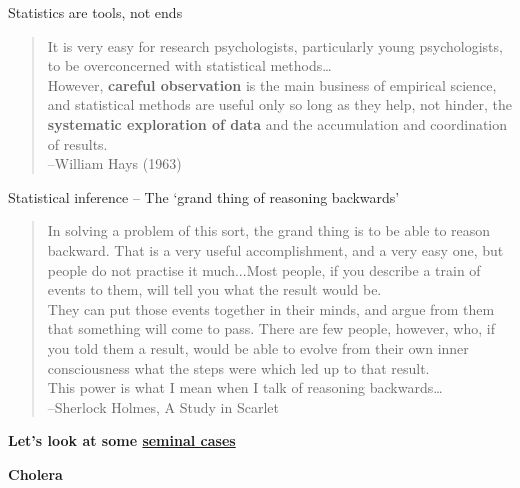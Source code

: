 \documentclass[aspectratio=1610,pdftex,dvipsnames,compress,xcolor={dvipsnames}]{beamer}
\begin{document}
\begin{frame}{Statistics are tools, not ends}
    \begin{quote}
        It is very easy for research psychologists, particularly young psychologists, to be overconcerned with statistical methods\ldots\\
        However, \textbf{careful observation} is the main business of empirical science, and statistical methods are useful only so long as they help, not hinder, the \textbf{systematic exploration of data} and the accumulation and coordination of results.\\
        --William Hays (1963)
    \end{quote}
\end{frame}


\begin{frame}{Statistical inference -- The `grand thing of reasoning backwards'}
    \begin{quote}
        In solving a problem of this sort, the grand thing is to be able to reason backward. That is a very useful accomplishment, and a very easy one, but people do not practise it much...Most people, if you describe a train of events to them, will tell you what the result would be.\\
        They can put those events together in their minds, and argue from them that something will come to pass.  There are few people, however, who, if you told them a result, would be able to evolve from their own inner consciousness what the steps were which led up to that result.\\
        This power is what I mean when I talk of reasoning backwards\ldots\\
        --Sherlock Holmes, A Study in Scarlet
    \end{quote}
\end{frame}


\begin{frame}[plain]{}
    \centering\LARGE\textbf{Let's look at some \href{https://uidaho.pressbooks.pub/riskassessment/chapter/probability-and-statistics/}{seminal cases}}
\end{frame}


\begin{frame}[plain]{}
    \centering\LARGE\textbf{Cholera}
\end{frame}
\end{document}

